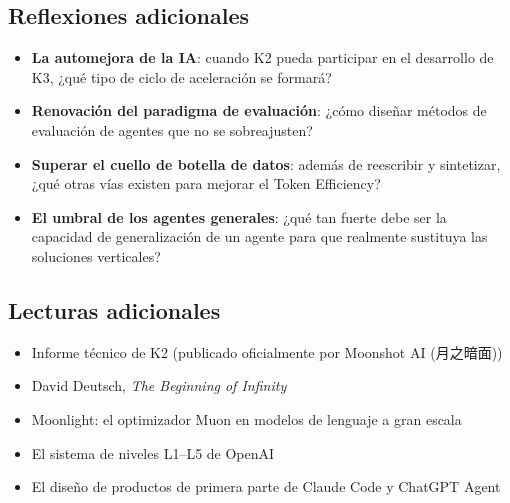 \documentclass[a4paper]{article}
\begin{document}
\subsection{Reflexiones adicionales}

\begin{itemize}
    \item \textbf{La automejora de la IA}: cuando K2 pueda participar en el desarrollo de K3, ¿qué tipo de ciclo de aceleración se formará?
    \item \textbf{Renovación del paradigma de evaluación}: ¿cómo diseñar métodos de evaluación de agentes que no se sobreajusten?
    \item \textbf{Superar el cuello de botella de datos}: además de reescribir y sintetizar, ¿qué otras vías existen para mejorar el Token Efficiency?
    \item \textbf{El umbral de los agentes generales}: ¿qué tan fuerte debe ser la capacidad de generalización de un agente para que realmente sustituya las soluciones verticales?
\end{itemize}

\subsection{Lecturas adicionales}

\begin{itemize}
    \item Informe técnico de K2 (publicado oficialmente por Moonshot AI (月之暗面))
    \item David Deutsch, \textit{The Beginning of Infinity}
    \item Moonlight: el optimizador Muon en modelos de lenguaje a gran escala
    \item El sistema de niveles L1--L5 de OpenAI
    \item El diseño de productos de primera parte de Claude Code y ChatGPT Agent
\end{itemize}

\end{document}
